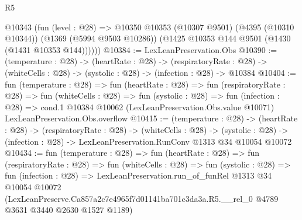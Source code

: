 \begin{lexlean}{R5}
\begin{coremodule}
      @10343
        (fun (level : @28) =>
        @10350
          @10353
          (@10307 @9501)
          (@4395 (@10310 @10344))
          (@1369 (@5994 @9503 @10286))
          (@1425 @10353 @144 @9501 (@1430 (@1431 @10353 @144))))))
@10384 := LexLeanPreservation.Obs
@10390 := (temperature : @28) ->
  (heartRate : @28) ->
  (respiratoryRate : @28) -> (whiteCells : @28) -> (systolic : @28) -> (infection : @28) -> @10384
@10404 := fun (temperature : @28) =>
  fun (heartRate : @28) =>
  fun (respiratoryRate : @28) =>
  fun (whiteCells : @28) =>
  fun (systolic : @28) =>
  fun (infection : @28) =>
  cond.{1} @10384 @10062 (LexLeanPreservation.Obs.value @10071) LexLeanPreservation.Obs.overflow
@10415 := (temperature : @28) ->
  (heartRate : @28) ->
  (respiratoryRate : @28) ->
  (whiteCells : @28) ->
  (systolic : @28) -> (infection : @28) -> LexLeanPreservation.RunConv @1313 @34 @10054 @10072
@10434 := fun (temperature : @28) =>
  fun (heartRate : @28) =>
  fun (respiratoryRate : @28) =>
  fun (whiteCells : @28) =>
  fun (systolic : @28) =>
  fun (infection : @28) =>
  LexLeanPreservation.run_of_funRel
    @1313
    @34
    @10054
    @10072
    (LexLeanPreserve.Ca857a2c7e4965f7d01141ba701c3da3a.R5.__rel_0
      @4789
      @3631
      @3440
      @2630
      @1527
      @1189)
\end{coremodule}
\end{lexlean}
